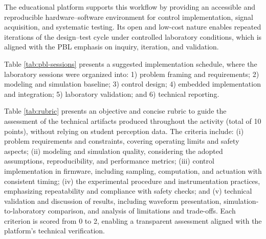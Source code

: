 \documentclass[english]{textolivre}
\begin{document}
The educational platform supports this workflow by providing an accessible and reproducible hardware–software environment for control implementation, signal acquisition, and systematic testing. Its open and low-cost nature enables repeated iterations of the design–test cycle under controlled laboratory conditions, which is aligned with the PBL emphasis on inquiry, iteration, and validation.

Table \ref{tab:pbl-sessions} presents a suggested implementation schedule, where the laboratory sessions were organized into: 1) problem framing and requirements; 2) modeling and simulation baseline; 3) control design; 4) embedded implementation and integration; 5) laboratory validation; and 6) technical reporting.

Table \ref{tab:rubric} presents an objective and concise rubric to guide the assessment of the technical artifacts produced throughout the activity (total of 10 points), without relying on student perception data. The criteria include: (i) problem requirements and constraints, covering operating limits and safety aspects; (ii) modeling and simulation quality, considering the adopted assumptions, reproducibility, and performance metrics; (iii) control implementation in firmware, including sampling, computation, and actuation with consistent timing; (iv) the experimental procedure and instrumentation practices, emphasizing repeatability and compliance with safety checks; and (v) technical validation and discussion of results, including waveform presentation, simulation-to-laboratory comparison, and analysis of limitations and trade-offs. Each criterion is scored from 0 to 2, enabling a transparent assessment aligned with the platform’s technical verification.
\end{document}
